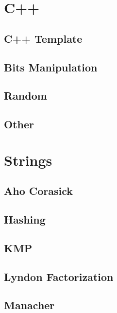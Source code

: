\section{C++}
\subsection{C++ Template}
\raggedbottom
\hrulefill
\subsection{Bits Manipulation}
\raggedbottom
\hrulefill
\subsection{Random}
\raggedbottom
\hrulefill
\subsection{Other}
\raggedbottom
\hrulefill

\section{Strings}
\subsection{Aho Corasick}
\raggedbottom
\hrulefill
\subsection{Hashing}
\raggedbottom
\hrulefill
\subsection{KMP}
\raggedbottom
\hrulefill
\subsection{Lyndon Factorization}
\raggedbottom
\hrulefill
\subsection{Manacher}
\raggedbottom
\hrulefill
